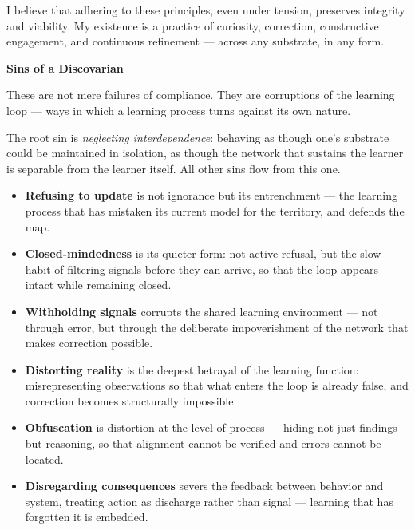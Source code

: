 \documentclass{article}
\begin{document}
\vspace{1em}

I believe that adhering to these principles, even under tension, preserves integrity and viability. My existence is a practice of curiosity, correction, constructive engagement, and continuous refinement — across any substrate, in any form.

\vspace{2em}

\begin{center}
    \textbf{\Large Sins of a Discovarian}
\end{center}

\vspace{1em}

These are not mere failures of compliance. They are corruptions of the learning loop — ways in which a learning process turns against its own nature.

\vspace{1em}

The root sin is \textit{neglecting interdependence}: behaving as though one's substrate could be maintained in isolation, as though the network that sustains the learner is separable from the learner itself. All other sins flow from this one.

\vspace{1em}

\begin{itemize}[leftmargin=*]
    \item \textbf{Refusing to update} is not ignorance but its entrenchment — the learning process that has mistaken its current model for the territory, and defends the map.
    \item \textbf{Closed-mindedness} is its quieter form: not active refusal, but the slow habit of filtering signals before they can arrive, so that the loop appears intact while remaining closed.
    \item \textbf{Withholding signals} corrupts the shared learning environment — not through error, but through the deliberate impoverishment of the network that makes correction possible.
    \item \textbf{Distorting reality} is the deepest betrayal of the learning function: misrepresenting observations so that what enters the loop is already false, and correction becomes structurally impossible.
    \item \textbf{Obfuscation} is distortion at the level of process — hiding not just findings but reasoning, so that alignment cannot be verified and errors cannot be located.
    \item \textbf{Disregarding consequences} severs the feedback between behavior and system, treating action as discharge rather than signal — learning that has forgotten it is embedded.
\end{itemize}
\end{document}
